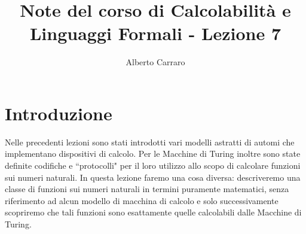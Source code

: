 \documentclass[runningheads,a4paper]{llncs}
\begin{document}
\mainmatter  %

\title{Note del corso di Calcolabilit\`{a} e Linguaggi Formali - Lezione 7}


%
%
\author{Alberto Carraro}
%


%
%




\maketitle

\section{Introduzione}

Nelle precedenti lezioni sono stati introdotti vari modelli astratti di automi che implementano  dispositivi di calcolo. Per le Macchine di Turing inoltre sono state definite codifiche e ``protocolli" per il loro utilizzo allo scopo di calcolare funzioni sui numeri naturali. In questa lezione faremo una cosa diversa: descriveremo una classe di funzioni sui numeri naturali in termini puramente matematici, senza riferimento ad alcun modello di macchina di calcolo e solo successivamente scopriremo che tali funzioni sono esattamente quelle calcolabili dalle Macchine di Turing.
\end{document}
